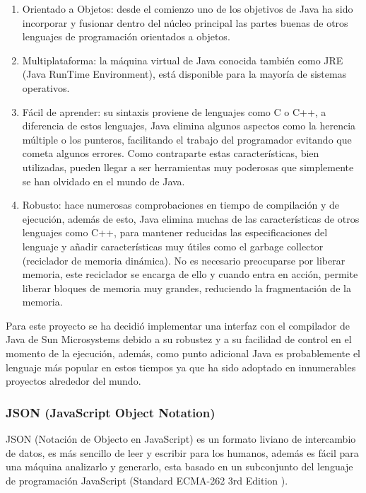 \begin{enumerate}
	
	\item Orientado a Objetos: desde el comienzo uno de los objetivos de Java ha sido incorporar y fusionar dentro del núcleo principal las partes buenas de otros lenguajes de programación orientados a objetos.
	
	\item Multiplataforma: la máquina virtual de Java conocida también como JRE (Java RunTime Environment), está disponible para la mayoría de sistemas operativos.
	
	\item Fácil de aprender: su sintaxis proviene de lenguajes como C o C++, a diferencia de estos lenguajes, Java elimina algunos aspectos como la herencia múltiple o los punteros, facilitando el trabajo del programador evitando que cometa algunos errores. Como contraparte estas características, bien utilizadas, pueden llegar a ser herramientas muy poderosas que simplemente se han olvidado en el mundo de Java.
	
	\item Robusto: hace numerosas comprobaciones en tiempo de compilación y de ejecución, además de esto, Java elimina muchas de las características de otros lenguajes como C++, para mantener reducidas las especificaciones del lenguaje y añadir características muy útiles como el garbage collector (reciclador de memoria dinámica). No es necesario preocuparse por liberar memoria, este reciclador se encarga de ello y cuando entra en acción, permite liberar bloques de memoria muy grandes, reduciendo la fragmentación de la memoria.
	
\end{enumerate}

Para este proyecto se ha decidió implementar una interfaz con el compilador de Java de Sun Microsystems debido a su robustez y a su facilidad de control en el momento de la ejecución, además, como punto adicional Java es probablemente el lenguaje más popular en estos tiempos ya que ha sido adoptado en innumerables proyectos alrededor del mundo.


\subsubsection{JSON (JavaScript Object Notation)}
\label{tec:json}

JSON \cite{json} (Notación de Objecto en JavaScript) es un formato liviano de intercambio de datos, es más sencillo de leer y escribir para los humanos, además es fácil para una máquina analizarlo y generarlo, esta basado en un subconjunto del lenguaje de programación JavaScript (Standard ECMA-262 3rd Edition \cite{json_ecma}).


